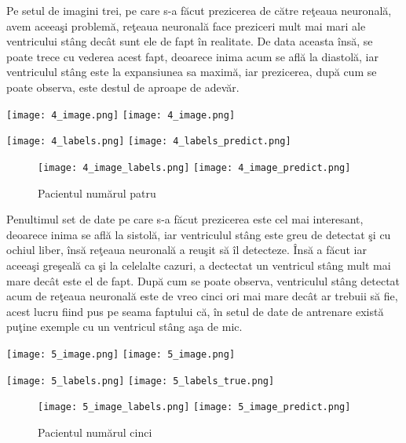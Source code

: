 Pe setul de imagini trei, pe care s-a f\u{a}cut prezicerea de c\u{a}tre re\c{t}eaua neuronal\u{a}, avem aceea\c{s}i problem\u{a}, re\c{t}eaua neuronal\u{a} face preziceri mult mai mari ale ventricului st\^{a}ng dec\^{a}t sunt ele de fapt \^{i}n realitate. De data aceasta \^{i}ns\u{a}, se poate trece cu vederea acest fapt, deoarece inima acum se afl\u{a} la diastol\u{a}, iar ventriculul st\^{a}ng este la expansiunea sa maxim\u{a}, iar prezicerea, dup\u{a} cum se poate observa, este destul de aproape de adev\u{a}r.

\begin{center}
\texttt{[image: 4\_image.png]}
\texttt{[image: 4\_image.png]}
\end{center}

\begin{center}
\texttt{[image: 4\_labels.png]}
\texttt{[image: 4\_labels\_predict.png]}
\end{center}

\begin{figure}[h!]
  \center
  \texttt{[image: 4\_image\_labels.png]}
\texttt{[image: 4\_image\_predict.png]}
  \caption{Pacientul num\u{a}rul patru}
\end{figure}


Penultimul set de date pe care s-a f\u{a}cut prezicerea este cel mai interesant, deoarece inima se afl\u{a} la sistol\u{a}, iar ventriculul st\^{a}ng este greu de detectat \c{s}i cu ochiul liber, \^{i}ns\u{a} re\c{t}eaua neuronal\u{a} a reu\c{s}it s\u{a} \^{i}l detecteze. \^{I}ns\u{a} a f\u{a}cut iar aceea\c{s}i gre\c{s}eal\u{a} ca \c{s}i la celelalte cazuri, a dectectat un ventricul st\^{a}ng mult mai mare dec\^{a}t este el de fapt. Dup\u{a} cum se poate observa, ventriculul st\^{a}ng detectat acum de re\c{t}eaua neuronal\u{a} este de vreo cinci ori mai mare dec\^{a}t ar trebuii s\u{a} fie, acest lucru fiind pus pe seama faptului c\u{a}, \^{i}n setul de date de antrenare exist\u{a} pu\c{t}ine exemple cu un ventricul st\^{a}ng a\c{s}a de mic.

\begin{center}
\texttt{[image: 5\_image.png]}
\texttt{[image: 5\_image.png]}
\end{center}

\begin{center}
\texttt{[image: 5\_labels.png]}
\texttt{[image: 5\_labels\_true.png]}
\end{center}

\begin{figure}[h!]
  \center
  \texttt{[image: 5\_image\_labels.png]}
\texttt{[image: 5\_image\_predict.png]}
  \caption{Pacientul num\u{a}rul cinci}
\end{figure}


